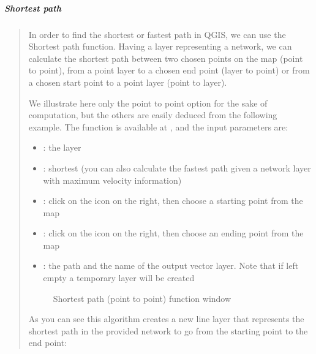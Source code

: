\documentclass[letterpaper,10pt,english]{sphinxmanual}
\let\sphinxpxdimen\pdfpxdimen\else\newdimen\sphinxpxdimen
\begin{document}
\subparagraph{Shortest path}
\label{\detokenize{vector/network:shortest-path}}\begin{quote}

In order to find the shortest or fastest path in QGIS, we can use the Shortest path function. Having a layer representing a network, we can
calculate the shortest path between two chosen points on the map (point to point), from a point layer to a chosen end point (layer to point)
or from a chosen start point to a point layer (point to layer).

We illustrate here only the point to point option for the sake of computation, but the others are easily deduced from the following example.
The function is available at , and the input parameters are:
\begin{itemize}
\item {} 
: the  layer

\item {} 
: shortest (you can also calculate the fastest path given a network layer with maximum velocity information)

\item {} 
: click on the icon on the right, then choose a starting point from the map

\item {} 
: click on the icon on the right, then choose an ending point from the map

\item {} 
: the path and the name of the output vector layer. Note that if left empty a temporary layer will be created

\end{itemize}

\begin{figure}[htbp]
\centering
\capstart

\noindent\sphinxincludegraphics[width=800\sphinxpxdimen]{{3.5.1_shortest_path}.PNG}
\caption{Shortest path (point to point) function window}\label{\detokenize{vector/network:id1}}\end{figure}

As you can see this algorithm creates a new line layer that represents the shortest path in the provided network to go from the starting
point to the end point:

\noindent{}
\end{quote}
\end{document}
